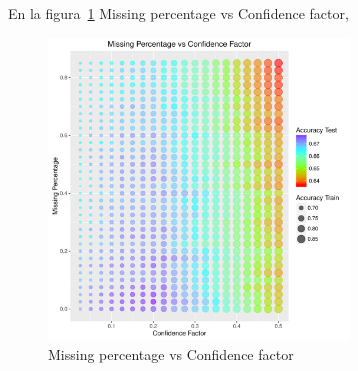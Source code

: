 En la figura~\ref{fig:4d} Missing percentage vs Confidence factor,

\begin{figure}
  \centering
  \includegraphics[width = 8cm]{4d.pdf}
  \caption{Missing percentage vs Confidence factor}
  \label{fig:4d}
\end{figure}
